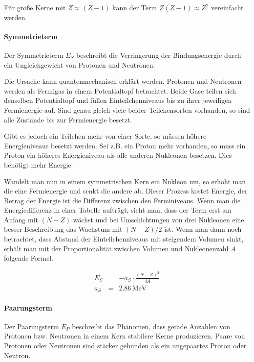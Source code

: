\documentclass[12pt,a4paper]{scrartcl}
\numberwithin{equation}{section} %
\renewcommand{\[}{} %
\renewcommand{\]}{\noindent} %
\begin{document}
Für große Kerne mit \(Z\approx(Z-1)\) kann der Term
\(Z(Z-1)\approx Z^2\) vereinfacht werden.

\hypertarget{symmetrieterm}{%
\paragraph{Symmetrieterm}\label{symmetrieterm}}

Der Symmetrieterm \(E_S\) beschreibt die Verringerung der
Bindungsenergie durch ein Ungleichgewicht von Protonen und Neutronen.

Die Ursache kann quantenmechanisch erklärt werden. Protonen und
Neutronen werden als Fermigas in einem Potentialtopf betrachtet. Beide
Gase teilen sich denselben Potentialtopf und füllen Einteilchenniveaus
bis zu ihrer jeweiligen Fermienergie auf. Sind genau gleich viele beider
Teilchensorten vorhanden, so sind alle Zustände bis zur Fermienergie
besetzt.

Gibt es jedoch ein Teilchen mehr von einer Sorte, so müssen höhere
Energieniveaus besetzt werden. Sei z.B. ein Proton mehr vorhanden, so
muss ein Proton ein höheres Energieniveau als alle anderen Nukleonen
besetzen. Dies benötigt mehr Energie.

Wandelt man nun in einem symmetrischen Kern ein Nukleon um, so erhöht
man die eine Fermienergie und senkt die andere ab. Dieser Prozess kostet
Energie, der Betrag der Energie ist die Differenz zwischen den
Ferminiveaus. Wenn man die Energiedifferenz in einer Tabelle aufträgt,
sieht man, dass der Term erst am Anfang mit \((N-Z)\) wächst und bei
Umschichtungen von drei Nukleonen eine besser Beschreibung das Wachstum
mit \((N-Z)/2\) ist. Wenn man dann noch betrachtet, dass Abstand der
Einteilchenniveaus mit steigendem Volumen sinkt, erhält man mit der
Proportionalität zwischen Volumen und Nukleonenzahl \(A\) folgende
Formel.

\[
\begin{eqnarray}
    E_S &=& - a_S\cdot \frac{(N-Z)^2}{4A} \label{Symmetrieterm} \\
    a_S &=& 2.86\mathrm{\,MeV}
\end{eqnarray}
\]

\hypertarget{paarungsterm}{%
\paragraph{Paarungsterm}\label{paarungsterm}}

Der Paarungsterm \(E_P\) beschreibt das Phänomen, dass gerade Anzahlen
von Protonen bzw. Neutronen in einem Kern stabilere Kerne produzieren.
Paare von Protonen oder Neutronen sind stärker gebunden als ein
ungepaartes Proton oder Neutron.
\end{document}

